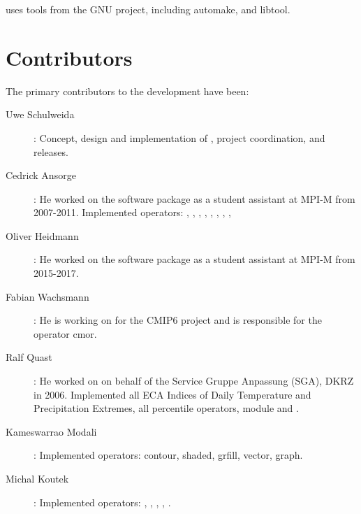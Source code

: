 {\CDO} uses tools from the GNU project, including automake, and libtool. 

\section{Contributors}

The primary contributors to the {\CDO} development have been: 

\begin{description}
\item[Uwe Schulweida]: Concept, design and implementation of {\CDO}, project coordination, and releases.



\item[Cedrick Ansorge]: He worked on the {\CDO} software package as a student assistant at MPI-M from 2007-2011.
Implemented operators: {}, {}, {}, {},
 {}, {}, {}, {}, {}

\item[Oliver Heidmann]: He worked on the {\CDO} software package as a student assistant at MPI-M from 2015-2017.

\item[Fabian Wachsmann]: He is working on {\CDO} for the CMIP6 project and is responsible for the operator cmor.

\item[Ralf Quast]: He worked on {\CDO} on behalf of the Service Gruppe Anpassung (SGA), DKRZ in 2006.
Implemented all ECA Indices of Daily Temperature and Precipitation Extremes, 
all percentile operators, module {} and {}.

\item[Kameswarrao Modali]: Implemented operators: contour, shaded, grfill, vector, graph.

\item[Michal Koutek]: Implemented operators: {}
{}, {}, {}
{}, {}, {}.


\end{description}
